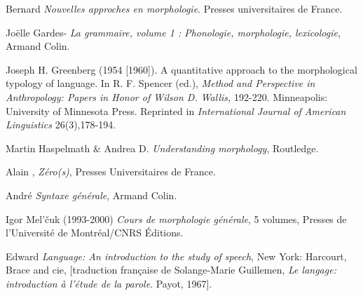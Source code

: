 {    Bernard \citet{Fradin2003} \textit{Nouvelles approches en morphologie}. Presses universitaires de France.

    Joëlle Gardes-\citet{Tamine1990} \textit{La grammaire, volume 1 : Phonologie, morphologie, lexicologie}, Armand Colin.

    Joseph H. Greenberg (1954 [1960]). A quantitative approach to the morphological typology of language. In R. F. Spencer (ed.), \textit{Method and Perspective in Anthropology: Papers in Honor of Wilson D. Wallis,} 192-220. Minneapolis: University of Minnesota Press. Reprinted in \textit{International Journal of American Linguistics} 26(3),178-194.

    Martin Haspelmath \& Andrea D. \citet{Sims2013} \textit{Understanding morphology}, Routledge.

    Alain \citet{Lemaréchal1997}, \textit{Zéro(s)}, Presses Universitaires de France.

    André \citet{Martinet1985} \textit{Syntaxe générale}, Armand Colin.

    Igor Mel’čuk (1993-2000) \textit{Cours de morphologie générale}, 5 volumes, Presses de l’Université de Montréal/CNRS Éditions.

    Edward \citet{Sapir1921} \textit{Language: An introduction to the study of speech}, {New York: Harcourt, Brace and cie,} [traduction française de Solange-Marie Guillemen, \textit{Le langage: introduction à l’étude de la parole}. Payot, 1967].
}
